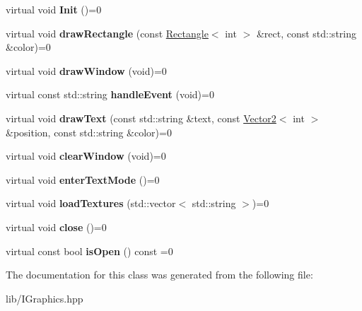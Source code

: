 \begin{DoxyCompactItemize}
\item 
\mbox{\label{class_i_graphics_a7d56d29cf685199d3369d9e2a35ee531}} 
virtual void {\bfseries Init} ()=0
\item 
\mbox{\label{class_i_graphics_a13387f73d81f2e66127cc317febb6e8a}} 
virtual void {\bfseries draw\+Rectangle} (const \hyperlink{struct_rectangle}{Rectangle}$<$ int $>$ \&rect, const std\+::string \&color)=0
\item 
\mbox{\label{class_i_graphics_a2d49395b7140d1348f739535b5412eea}} 
virtual void {\bfseries draw\+Window} (void)=0
\item 
\mbox{\label{class_i_graphics_a1e3e1573e3fd226f5b939ed32083ba20}} 
virtual const std\+::string {\bfseries handle\+Event} (void)=0
\item 
\mbox{\label{class_i_graphics_a27551effcc2af1f9071a30a466ad09c8}} 
virtual void {\bfseries draw\+Text} (const std\+::string \&text, const \hyperlink{struct_vector2}{Vector2}$<$ int $>$ \&position, const std\+::string \&color)=0
\item 
\mbox{\label{class_i_graphics_a380e9d5db4f52905a73d3d0a12b880f0}} 
virtual void {\bfseries clear\+Window} (void)=0
\item 
\mbox{\label{class_i_graphics_a9d8f215aba1b8cda8d1a4b87e9cb3eaa}} 
virtual void {\bfseries enter\+Text\+Mode} ()=0
\item 
\mbox{\label{class_i_graphics_a5c3bf577570c5447f6e8f2eeffc08933}} 
virtual void {\bfseries load\+Textures} (std\+::vector$<$ std\+::string $>$)=0
\item 
\mbox{\label{class_i_graphics_a0da7a8862b6cc41046edee979be9faa8}} 
virtual void {\bfseries close} ()=0
\item 
\mbox{\label{class_i_graphics_a785e4c5f06c8e1a21028581f8cd76f5d}} 
virtual const bool {\bfseries is\+Open} () const =0
\end{DoxyCompactItemize}


The documentation for this class was generated from the following file\+:\begin{DoxyCompactItemize}
\item 
lib/I\+Graphics.\+hpp\end{DoxyCompactItemize}
